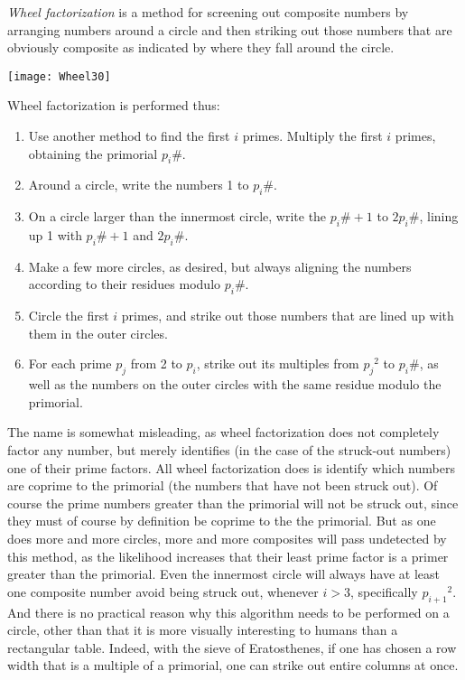 \documentclass[12pt]{article}
\begin{document}
{\em Wheel factorization} is a method for screening out composite numbers by arranging numbers around a circle and then striking out those numbers that are obviously composite as indicated by where they fall around the circle.

\begin{center}
\texttt{[image: Wheel30]}
\end{center}

Wheel factorization is performed thus:

\begin{enumerate}
\item Use another method to find the first $i$ primes. Multiply the first $i$ primes, obtaining the primorial $p_i\#$.
\item Around a circle, write the numbers 1 to $p_i\#$.
\item On a circle larger than the innermost circle, write the $p_i\# + 1$ to $2p_i\#$, lining up 1 with $p_i\# + 1$ and $2p_i\#$.
\item Make a few more circles, as desired, but always aligning the numbers according to their residues modulo $p_i\#$.
\item Circle the first $i$ primes, and strike out those numbers that are lined up with them in the outer circles.
\item For each prime $p_j$ from 2 to $p_i$, strike out its multiples from ${p_j}^2$ to $p_i\#$, as well as the numbers on the outer circles with the same residue modulo the primorial.
\end{enumerate}

The name is somewhat misleading, as wheel factorization does not completely factor any number, but merely identifies (in the case of the struck-out numbers) one of their prime factors. All wheel factorization does is identify which numbers are coprime to the primorial (the numbers that have not been struck out). Of course the prime numbers greater than the primorial will not be struck out, since they must of course by definition be coprime to the the primorial. But as one does more and more circles, more and more composites will pass undetected by this method, as the likelihood increases that their least prime factor is a primer greater than the primorial. Even the innermost circle will always have at least one composite number avoid being struck out, whenever $i > 3$, specifically ${p_{i + 1}}^2$. And there is no practical reason why this algorithm needs to be performed on a circle, other than that it is more visually interesting to humans than a rectangular table. Indeed, with the sieve of Eratosthenes, if one has chosen a row width that is a multiple of a primorial, one can strike out entire columns at once.
\end{document}
